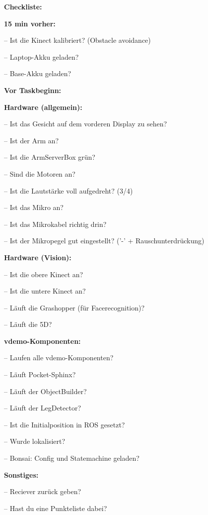 \documentclass[a4paper]{scrartcl}
\let\oldmarginpar\marginpar
\renewcommand\marginpar[1]{\-\oldmarginpar[\raggedleft #1]%
{\raggedright #1}}
\newenvironment{checklist}{%
  \begin{list}{}{}%
  \let\olditem\item
  \renewcommand\item{\olditem -- \marginpar{$\Box$} }
  \newcommand\checkeditem{\olditem -- \marginpar{$\CheckedBox$} }
}{%
  \end{list}
}
\begin{document}
\begin{center}
\textbf{\Huge Checkliste:}\\
\end{center}
\begin{center}
\textbf{15 min vorher:}
\end{center}
\begin{checklist}
  \item Ist die Kinect kalibriert? (Obstacle avoidance)
  \item Laptop-Akku geladen?
  \item Base-Akku geladen?
\end{checklist}


\begin{center}
\textbf{Vor Taskbeginn:}
\end{center}
\textbf{Hardware (allgemein):}
\begin{checklist}
	\item Ist das Gesicht auf dem vorderen Display zu sehen?
	\item Ist der Arm an?
	\item Ist die ArmServerBox gr\"un?
	\item Sind die Motoren an?
	\item Ist die Lautst\"arke voll aufgedreht? (3/4)
	\item Ist das Mikro an?
	\item Ist das Mikrokabel richtig drin?
	\item Ist der Mikropegel gut eingestellt? ('-' + Rauschunterdr\"uckung)
\end{checklist}
\textbf{Hardware (Vision):}
\begin{checklist}
	\item Ist die obere Kinect an?
	\item Ist die untere Kinect an?
	\item L\"auft die Grashopper (f\"ur Facerecognition)?
	\item L\"auft die 5D?
\end{checklist}	
\textbf{vdemo-Komponenten:}
\begin{checklist}
	\item Laufen alle vdemo-Komponenten?
	\item L\"auft Pocket-Sphinx?
	\item L\"auft der ObjectBuilder?
	\item L\"auft der LegDetector?
	\item Ist die Initialposition in ROS gesetzt? 
	\item Wurde lokalisiert?
	\item Bonsai: Config und Statemachine geladen?  
\end{checklist}
\textbf{Sonstiges:}
\begin{checklist}
	\item Reciever zur\"uck geben?
	\item Hast du eine Punkteliste dabei?
\end{checklist}
\end{document}
